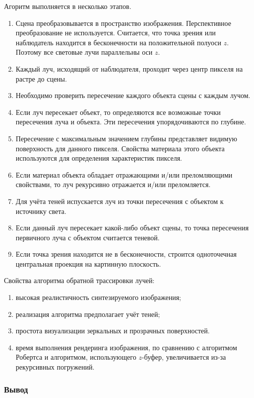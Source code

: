 Агоритм выполняется в несколько этапов.

\begin{enumerate}[label=\arabic*)]
	\item Сцена преобразовывается в пространство изображения. Перспективное преобразование не используется. Считается, что точка зрения или наблюдатель находится в бесконечности на положительной полуоси $z$. Поэтому все световые лучи параллельны оси $z$. 
	\item Каждый луч, исходящий от наблюдателя, проходит через центр пикселя на растре до сцены.
	\item Необходимо проверить пересечение каждого объекта сцены с каждым лучом.
	\item Если луч пересекает объект, то определяются все возможные точки пересечения луча и объекта. Эти пересечения упорядочиваются по глубине.
	\item Пересечение с максимальным значением глубины представляет видимую поверхность для данного пикселя. Свойства материала этого объекта используются для определения характеристик пикселя.
	\item Если материал объекта обладает отражающими и/или преломляющими свойствами, то луч рекурсивно отражается и/или преломляется.
	\item Для учёта теней испускается луч из точки пересечения с объектом к источнику света.
	\item Если данный луч пересекает какой-либо объект сцены, то точка пересечения первичного луча с объектом считается теневой.
	\item Если точка зрения находится не в бесконечности, строится одноточечная центральная проекция на картинную плоскость.
\end{enumerate}


Свойства алгоритма обратной трассировки лучей:
\begin{enumerate}[label=\arabic*)]
	\item высокая реалистичность синтезируемого изображения;
	\item реализация алгоритма предполагает учёт теней;
	\item простота визуализации зеркальных и прозрачных поверхностей.
	\item время выполнения рендеринга изображения, по сравнению с алгоритмом Робертса и алгоритмом, использующего $z$-буфер, увеличивается из-за рекурсивных погружений.
\end{enumerate}

\subsubsection{Вывод}

